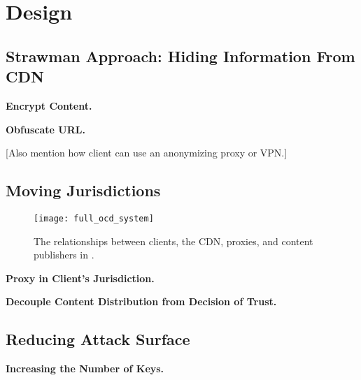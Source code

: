 \section{Design}
\label{sec:design}

\subsection{Strawman Approach: Hiding Information From CDN}

{\bf Encrypt Content.}

{\bf Obfuscate URL.}

[Also mention how client can use an anonymizing proxy or VPN.]

\subsection{Moving Jurisdictions}

\begin{figure}[h]
\centering
\texttt{[image: full\_ocd\_system]}
\caption{The relationships between clients, the CDN, proxies, and content publishers in 
\system{}.}
\label{fig:ocd_overview}
\end{figure}

{\bf Proxy in Client's Jurisdiction.}

{\bf Decouple Content Distribution from Decision of Trust.}

\subsection{Reducing Attack Surface}

{\bf Increasing the Number of Keys.}
